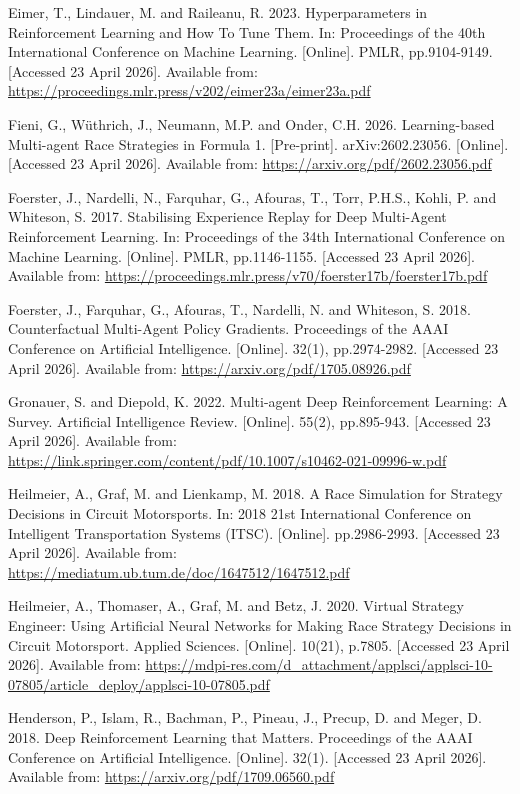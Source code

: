 Eimer, T., Lindauer, M. and Raileanu, R. 2023. Hyperparameters in Reinforcement Learning and How To Tune Them. In: Proceedings of the 40th International Conference on Machine Learning. [Online]. PMLR, pp.9104-9149. [Accessed 23 April 2026]. Available from: \url{https://proceedings.mlr.press/v202/eimer23a/eimer23a.pdf}

Fieni, G., W{\"u}thrich, J., Neumann, M.P. and Onder, C.H. 2026. Learning-based Multi-agent Race Strategies in Formula 1. [Pre-print]. arXiv:2602.23056. [Online]. [Accessed 23 April 2026]. Available from: \url{https://arxiv.org/pdf/2602.23056.pdf}

Foerster, J., Nardelli, N., Farquhar, G., Afouras, T., Torr, P.H.S., Kohli, P. and Whiteson, S. 2017. Stabilising Experience Replay for Deep Multi-Agent Reinforcement Learning. In: Proceedings of the 34th International Conference on Machine Learning. [Online]. PMLR, pp.1146-1155. [Accessed 23 April 2026]. Available from: \url{https://proceedings.mlr.press/v70/foerster17b/foerster17b.pdf}

Foerster, J., Farquhar, G., Afouras, T., Nardelli, N. and Whiteson, S. 2018. Counterfactual Multi-Agent Policy Gradients. Proceedings of the AAAI Conference on Artificial Intelligence. [Online]. 32(1), pp.2974-2982. [Accessed 23 April 2026]. Available from: \url{https://arxiv.org/pdf/1705.08926.pdf}

Gronauer, S. and Diepold, K. 2022. Multi-agent Deep Reinforcement Learning: A Survey. Artificial Intelligence Review. [Online]. 55(2), pp.895-943. [Accessed 23 April 2026]. Available from: \url{https://link.springer.com/content/pdf/10.1007/s10462-021-09996-w.pdf}

Heilmeier, A., Graf, M. and Lienkamp, M. 2018. A Race Simulation for Strategy Decisions in Circuit Motorsports. In: 2018 21st International Conference on Intelligent Transportation Systems (ITSC). [Online]. pp.2986-2993. [Accessed 23 April 2026]. Available from: \url{https://mediatum.ub.tum.de/doc/1647512/1647512.pdf}

Heilmeier, A., Thomaser, A., Graf, M. and Betz, J. 2020. Virtual Strategy Engineer: Using Artificial Neural Networks for Making Race Strategy Decisions in Circuit Motorsport. Applied Sciences. [Online]. 10(21), p.7805. [Accessed 23 April 2026]. Available from: \url{https://mdpi-res.com/d_attachment/applsci/applsci-10-07805/article_deploy/applsci-10-07805.pdf}

Henderson, P., Islam, R., Bachman, P., Pineau, J., Precup, D. and Meger, D. 2018. Deep Reinforcement Learning that Matters. Proceedings of the AAAI Conference on Artificial Intelligence. [Online]. 32(1). [Accessed 23 April 2026]. Available from: \url{https://arxiv.org/pdf/1709.06560.pdf}

